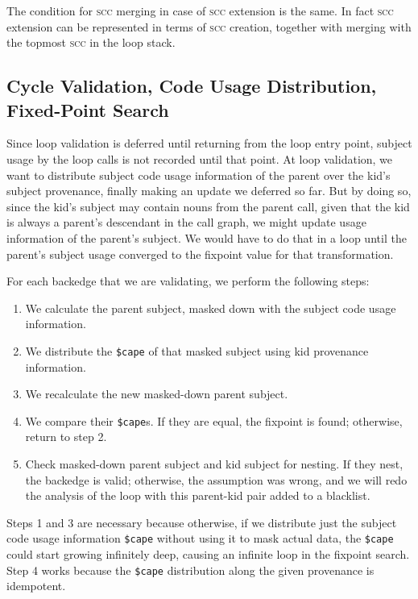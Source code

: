\documentclass[twoside]{article}
\begin{document}
The condition for \textsc{scc} merging in case of \textsc{scc} extension is the same.  In fact \textsc{scc} extension can be represented in terms of \textsc{scc} creation, together with merging with the topmost \textsc{scc} in the loop stack.

\subsection{Cycle Validation, Code Usage Distribution, Fixed-Point Search}

Since loop validation is deferred until returning from the loop entry point, subject usage by the loop calls is not recorded until that point.  At loop validation, we want to distribute subject code usage information of the parent over the kid's subject provenance, finally making an update we deferred so far. But by doing so, since the kid's subject may contain nouns from the parent call, given that the kid is always a parent's descendant in the call graph, we might update usage information of the parent's subject.  We would have to do that in a loop until the parent's subject usage converged to the fixpoint value for that transformation.

For each backedge that we are validating, we perform the following steps:

\begin{enumerate}
\item We calculate the parent subject, masked down with the subject code usage information.
\item We distribute the \lstinline[style=inlinecode]{$cape} of that masked subject using kid provenance information.
\item We recalculate the new masked-down parent subject.
\item We compare their \lstinline[style=inlinecode]{$cape}s. If they are equal, the fixpoint is found; otherwise, return to step 2.
\item Check masked-down parent subject and kid subject for nesting.  If they nest, the backedge is valid; otherwise, the assumption was wrong, and we will redo the analysis of the loop with this parent-kid pair added to a blacklist.
\end{enumerate}

Steps 1 and 3 are necessary because otherwise, if we distribute just the subject code usage information \lstinline[style=inlinecode]{$cape} without using it to mask actual data, the \lstinline[style=inlinecode]{$cape} could start growing infinitely deep, causing an infinite loop in the fixpoint search. Step 4 works because the \lstinline[style=inlinecode]{$cape} distribution along the given provenance is idempotent.
\end{document}

